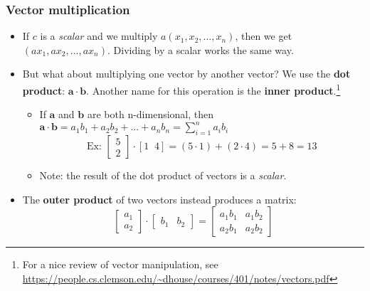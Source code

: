 \subsubsection{Vector multiplication}

\begin{itemize}
    \item If $c$ is a \emph{scalar} and we multiply $a(x_1, x_2, ..., x_n)$, then we get $(ax_1, ax_2, ..., ax_n)$. Dividing by a scalar works the same way.
    \item But what about multiplying one vector by another vector? We use the \textbf{dot product}: $\bm{a} \cdot \bm{b}$. Another name for this operation is the \textbf{inner product}.\footnote{For a nice review of vector manipulation, see \url{https://people.cs.clemson.edu/~dhouse/courses/401/notes/vectors.pdf}}
    \begin{itemize}
        \item If $\bm{a}$ and $\bm{b}$ are both n-dimensional, then $\bm{a} \cdot \bm{b} = a_1b_1 + a_2b_2 + ... + a_nb_n = \sum\limits_{i=1}^na_ib_i$
        \begin{equation*}
            \text{Ex: }
            \begin{bmatrix}
                5 \\
                2
            \end{bmatrix} \cdot 
            [1 \; \; 4]
            = (5 \cdot 1) + (2 \cdot 4) = 5 + 8 = 13  
        \end{equation*}
        \item Note: the result of the dot product of vectors is a \emph{scalar}.
    \end{itemize}
    \item The \textbf{outer product} of two vectors instead produces a matrix:
    \begin{equation*}
        \begin{bmatrix}
            a_1 \\
            a_2
        \end{bmatrix} \cdot 
        \begin{bmatrix}
            b_1 & b_2
        \end{bmatrix}
        = \begin{bmatrix}
            a_1b_1 & a_1b_2 \\
            a_2b_1 & a_2b_2
        \end{bmatrix}  

\end{equation*}
\end{itemize}
